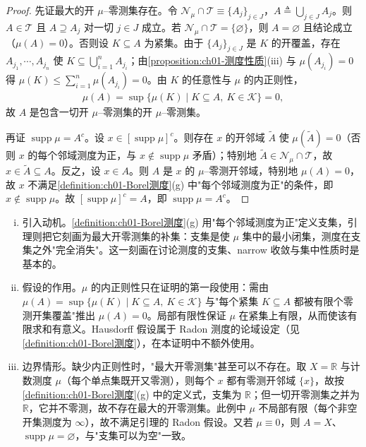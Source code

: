 \documentclass[../../main.tex]{subfiles}%
\begin{document}
\begin{proof}
先证最大的开 $\mu$--零测集存在。令 $\mathcal{N}_\mu\cap\mathcal{T}\equiv\{A_j\}_{j\in J}$，$A\triangleq\bigcup_{j\in J}A_j$。则 $A\in\mathcal{T}$ 且 $A\supseteq A_j$ 对一切 $j\in J$ 成立。若 $\mathcal{N}_\mu\cap\mathcal{T}=\{\varnothing \}$，则 $A=\varnothing$ 且结论成立（$\mu(A)=0$）。否则设 $K\subseteq A$ 为紧集。由于 $\{A_j\}_{j\in J}$ 是 $K$ 的开覆盖，存在 $A_{j_1},\cdots ,A_{j_n}$ 使 $K\subseteq\bigcup_{i=1}^nA_{j_i}$；由\cref{proposition:ch01-测度性质}(iii) 与 $\mu(A_{j_i})=0$ 得 $\mu(K)\leqslant\sum_{i=1}^n\mu(A_{j_i})=0$。由 $K$ 的任意性与 $\mu$ 的内正则性，
\begin{align*}
\mu(A)=\sup\{\mu(K)\mid K\subseteq A,\ K\in\mathcal{K}\}=0,
\end{align*}
故 $A$ 是包含一切开 $\mu$--零测集的开 $\mu$--零测集。

再证 $\operatorname{supp}\mu=A^c$。设 $x\in[\operatorname{supp}\mu]^c$。则存在 $x$ 的开邻域 $\widetilde{A}$ 使 $\mu(\widetilde{A})=0$（否则 $x$ 的每个邻域测度为正，与 $x\notin\operatorname{supp}\mu$ 矛盾）；特别地 $\widetilde{A}\in\mathcal{N}_\mu\cap\mathcal{T}$，故 $x\in\widetilde{A}\subseteq A$。反之，设 $x\in A$。则 $A$ 是 $x$ 的 $\mu$--零测开邻域，特别地 $\mu(A)=0$，故 $x$ 不满足\cref{definition:ch01-Borel测度}(g) 中"每个邻域测度为正"的条件，即 $x\notin\operatorname{supp}\mu$。故 $[\operatorname{supp}\mu]^c=A$，即 $\operatorname{supp}\mu=A^c$。
\end{proof}

\begin{remark}\label{remark:ch01-支集刻画注}
\begin{enumerate}[(i)]
\item 引入动机。\cref{definition:ch01-Borel测度}(g) 用"每个邻域测度为正"定义支集，引理则把它刻画为最大开零测集的补集：支集是使 $\mu$ 集中的最小闭集，测度在支集之外"完全消失"。这一刻画在讨论测度的支集、narrow 收敛与集中性质时是基本的。
\item 假设的作用。$\mu$ 的内正则性只在证明的第一段使用：需由 $\mu(A)=\sup\{\mu(K)\mid K\subseteq A,\ K\in\mathcal{K}\}$ 与"每个紧集 $K\subseteq A$ 都被有限个零测开集覆盖"推出 $\mu(A)=0$。局部有限性保证 $\mu$ 在紧集上有限，从而使该有限求和有意义。Hausdorff 假设属于 Radon 测度的论域设定（见\cref{definition:ch01-Borel测度}），在本证明中不额外使用。
\item 边界情形。缺少内正则性时，"最大开零测集"甚至可以不存在。取 $X=\mathbb{R}$ 与计数测度 $\mu$（每个单点集既开又零测），则每个 $x$ 都有零测开邻域 $\{x\}$，故按\cref{definition:ch01-Borel测度}(g) 中的定义式，支集为 $\mathbb{R}$；但一切开零测集之并为 $\mathbb{R}$，它并不零测，故不存在最大的开零测集。此例中 $\mu$ 不局部有限（每个非空开集测度为 $\infty$），故不满足引理的 Radon 假设。又若 $\mu\equiv0$，则 $A=X$、$\operatorname{supp}\mu=\varnothing$，与"支集可以为空"一致。
\end{enumerate}
\end{remark}
\end{document}
